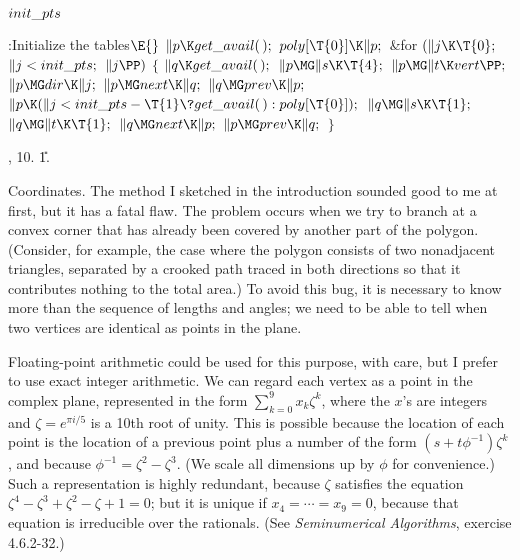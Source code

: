 \Y\B\4\D$\\{init\_pts}$ \5
\par
\Y\B\4:Initialize the tables\X${}\E{}$\6
$\|p\K\\{get\_avail}(\,);{}$\6
${}\\{poly}[\T{0}]\K\|p;{}$\6
\&{for} ${}(\|j\K\T{0};{}$ ${}\|j<\\{init\_pts};{}$ ${}\|j\PP){}$\5
${}\{{}$\1\6
${}\|q\K\\{get\_avail}(\,);{}$\6
${}\|p\MG\|s\K\T{4};{}$\6
${}\|p\MG\|t\K\\{vert}\PP;{}$\6
${}\|p\MG\\{dir}\K\|j;{}$\6
${}\|p\MG\\{next}\K\|q;{}$\6
${}\|q\MG\\{prev}\K\|p;{}$\6
${}\|p\K(\|j<\\{init\_pts}-\T{1}\?\\{get\_avail}(\,):\\{poly}[\T{0}]);{}$\6
${}\|q\MG\|s\K\T{1};{}$\6
${}\|q\MG\|t\K\T{1};{}$\6
${}\|q\MG\\{next}\K\|p;{}$\6
${}\|p\MG\\{prev}\K\|q;{}$\6
\4${}\}{}$\2\par
{}, 10.
\U1.\fi

Coordinates. The method I sketched in the introduction
sounded good
to me at first, but it has a fatal flaw. The problem occurs when we
try to branch at a convex corner that has already been covered by
another part of the polygon. (Consider, for example, the case where
the polygon consists of two nonadjacent triangles, separated by a
crooked path traced in both directions so that it contributes nothing
to the total area.) To avoid this bug, it is necessary to know more
than the sequence of lengths and angles; we need to be able to tell
when two vertices are identical as points in the plane.

Floating-point arithmetic could be used for this purpose, with care, but
I prefer to use exact integer arithmetic. We can regard each vertex
as a point in the complex plane, represented in the form $\sum_{k=0}^9
x_k\zeta^k$, where the $x$'s are integers and $\zeta=e^{\pi i/5}$ is a
10th root of unity. This is possible because the location of each point
is the location of a previous point plus a number of the form $(s
+t\phi^{-1})\zeta^k$, and because $\phi^{-1}=\zeta^2-\zeta^3$. (We scale
all dimensions up by $\phi$ for convenience.) Such a representation is
highly redundant, because $\zeta$ satisfies the equation $\zeta^4-\zeta^3
+\zeta^2-\zeta+1=0$; but it is unique if $x_4=\cdots=x_9=0$, because that
equation is irreducible over the rationals. (See {\sl Seminumerical
Algorithms}, exercise 4.6.2-32.)


